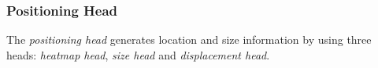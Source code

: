 \documentclass[acmsmall]{acmart}
\begin{document}


\subsubsection{Positioning Head} \label{sec:detection_head}
{
The \emph{positioning head} generates location and size information by using three heads: \emph{heatmap head}, \emph{size head} and \emph{displacement head}. 
}

\end{document}
